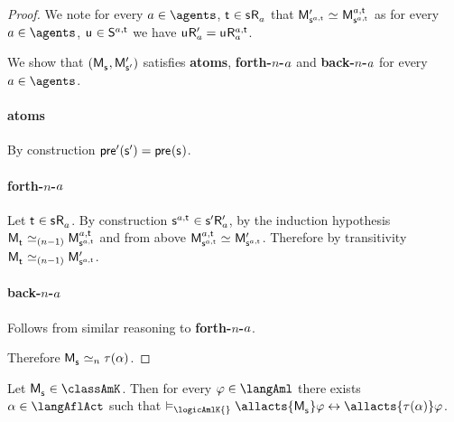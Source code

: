 \begin{proof}
We note for every $\agentA \in \agents$, $\aStateT \in \aStateS \aAccessibility{\agentA}$ that $\aPModel[\prime]{\aStateS[\agentA,\aStateT]} \bisimilar \aPModel[\agentA,\aStateT]{\aStateS[\agentA,\aStateT]}$ as for every $\agentA \in \agents$, $\aStateU \in \aStates[\agentA,\aStateT]$ we have $\aStateU \aAccessibility[\prime]{\agentA} = \aStateU \aAccessibility[\agentA,\aStateT]{\agentA}$.

We show that $(\aPModel{\aStateS}, \aPModel[\prime]{\aStateS[\prime]})$ satisfies {\bf atoms}, {\bf forth-$n$-$a$} and {\bf back-$n$-$a$} for every $\agentA \in \agents$.

\paragraph{atoms} By construction
$\aPrecondition[\prime](\aStateS[\prime]) = \aPrecondition(\aStateS)$.

\paragraph{forth-$n$-$a$} 
Let $\aStateT \in \aStateS \aAccessibility{\agentA}$.
By construction $\aStateS[\agentA,\aStateT] \in \aStateS[\prime] \aAccessibility[\prime]{\agentA}$, by the induction hypothesis $\aPModel{\aStateT} \bisimilar[(n - 1)] \aPModel[\agentA,\aStateT]{\aStateS[\agentA,\aStateT]}$ and from above $\aPModel[\agentA,\aStateT]{\aStateS[\agentA,\aStateT]} \bisimilar \aPModel[\prime]{\aStateS[\agentA,\aStateT]}$.
Therefore by transitivity $\aPModel{\aStateT} \bisimilar[(n - 1)] \aPModel[\prime]{\aStateS[\agentA,\aStateT]}$.

\paragraph{back-$n$-$a$} Follows from similar reasoning to {\bf forth-$n$-$a$}.

Therefore $\aPModel{\aStateS} \bisimilar[n] \tau(\alpha)$.
\end{proof}

\begin{corollary}\label{afl-k-correspondence-aml-allacts}
Let $\aPModel{\aStateS} \in \classAmK$.
Then for every $\phi \in \langAml$ there exists $\alpha \in \langAflAct$ such that $\entails_\logicAmlK{} \allacts{\aPModel{\aStateS}} \phi \iff \allacts{\tau(\alpha)} \phi$.
\end{corollary}

